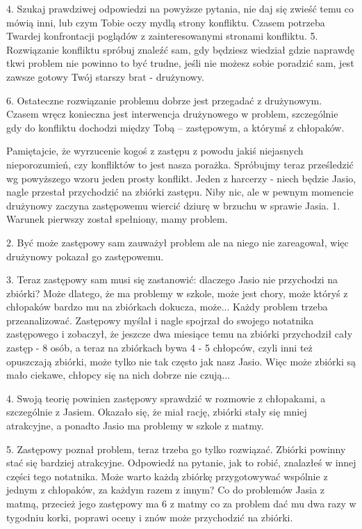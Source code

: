 4.
Szukaj prawdziwej odpowiedzi na powyższe pytania, nie daj  się zwieść temu co mówią inni, lub czym Tobie oczy  mydlą  strony konfliktu. Czasem potrzeba Twardej konfrontacji poglądów z zainteresowanymi stronami konfliktu.
5.
Rozwiązanie konfliktu spróbuj znaleźć sam, gdy będziesz wiedział  gdzie naprawdę tkwi problem nie powinno to być trudne, jeśli nie możesz sobie poradzić sam, jest zawsze  gotowy Twój  starszy brat - drużynowy.

6.
Ostateczne rozwiązanie problemu dobrze jest przegadać z drużynowym. Czasem wręcz konieczna jest interwencja drużynowego  w  problem, szczególnie gdy do konfliktu dochodzi między Tobą – zastępowym, a którymś z  chłopaków.


Pamiętajcie, że wyrzucenie kogoś z zastępu z powodu jakiś niejasnych nieporozumień, czy konfliktów to jest nasza porażka. Spróbujmy teraz prześledzić wg  powyższego  wzoru jeden prosty konflikt. Jeden z harcerzy - niech będzie Jasio, nagle przestał przychodzić na zbiórki zastępu. Niby nic, ale w pewnym momencie drużynowy zaczyna zastępowemu wiercić dziurę w brzuchu w  sprawie Jasia.
1.
Warunek  pierwszy  został   spełniony,  mamy  problem.

2.
Być  może  zastępowy  sam zauważył problem ale na niego nie  zareagował, więc drużynowy pokazał go zastępowemu. 

3.
Teraz zastępowy sam musi się zastanowić:  dlaczego Jasio nie  przychodzi na zbiórki? Może dlatego,  że ma problemy w  szkole,  może  jest chory, może któryś z chłopaków bardzo mu na zbiórkach dokucza,  może... Każdy problem trzeba przeanalizować. Zastępowy myślał i nagle spojrzał do  swojego notatnika zastępowego i zobaczył, że jeszcze dwa miesiące  temu na  zbiórki przychodził cały zastęp - 8 osób,  a teraz  na  zbiórkach bywa 4 - 5 chłopców, czyli inni też  opuszczają  zbiórki,  może  tylko nie tak często jak nasz Jasio. Więc może zbiórki są mało  ciekawe,  chłopcy  się na nich dobrze nie czują...

4.
Swoją teorię powinien zastępowy sprawdzić  w rozmowie z chłopakami, a szczególnie z Jasiem. Okazało się, że miał  rację,  zbiórki  stały się mniej atrakcyjne, a ponadto Jasio ma problemy w szkole  z matmy.

5.
Zastępowy poznał problem,  teraz trzeba go tylko rozwiązać. Zbiórki powinny stać się bardziej  atrakcyjne. Odpowiedź na pytanie, jak to  robić,  znalazłeś w innej  części tego notatnika. Może warto każdą zbiórkę przygotowywać wspólnie z jednym z chłopaków,  za każdym razem  z innym? Co do problemów Jasia z matmą, przecież jego zastępowy ma 6 z matmy co za problem dać mu dwa razy  w tygodniu korki,  poprawi  oceny i  znów  może  przychodzić na  zbiórki.

